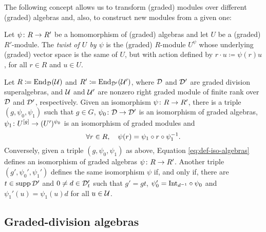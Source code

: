 The following concept allows us to transform (graded) modules over different (graded) algebras and, also, to construct new modules from a given one:

\begin{defi}\label{def:twist}
    Let $\psi\colon R \to R'$ be a homomorphism of (graded) algebras and let $U$ be a (graded) $R' $-module. 
    The \emph{twist of $U$ by $\psi$} is the (graded) $R$-module $U^{\psi}$ whose underlying (graded) vector space is the same of $U$, but with action defined by $r \cdot u \coloneqq \psi(r)u$, for all $r\in R$ and $u\in U$.
\end{defi}

\begin{thm}\label{thm:iso-abstract}
    Let $R \coloneqq \operatorname{End}_{\mathcal{D}}(\mathcal U)$ and $R' \coloneqq \operatorname{End}_{\mathcal{D}'}(\mathcal U')$, where $\mathcal{D}$ and $\mathcal{D}'$ are graded division superalgebras, and $\mathcal U$ and $\mathcal U'$ are nonzero right graded module of finite rank over $\mathcal{D}$ and $\mathcal{D}'$, respectively. 
    Given an isomorphism $\psi\colon R \to R'$, there is a triple $(g, \psi_0, \psi_1)$ such that $g \in G$, $\psi_0\colon \mathcal{D} \to \mathcal{D}'$ is an isomorphism of graded algebras, $\psi_1\colon U^{[g]} \to (U')^{\psi_0}$ is an isomorphism of graded modules and 
    \begin{equation}\label{eq:def-iso-algebras}
            \forall r\in R, \quad \psi(r) = \psi_1 \circ r \circ \psi_1^{-1}.
    \end{equation}
    Conversely, given a triple $(g, \psi_0, \psi_1)$ as above, Equation \eqref{eq:def-iso-algebras} defines an isomorphism of graded algebras $\psi\colon R \to R'$. 
    Another triple $(g', \psi_0', \psi_1')$ defines the same isomorphism $\psi$ if, and only if, there are $t\in \operatorname{supp} \mathcal{D}'$ and $0 \neq d\in \mathcal{D}'_t$ such that $g'= gt$, $\psi_0' = \mathrm{Int}_{d^{-1}} \circ \psi_0$ and $\psi_1' (u) = \psi_1 (u) d$ for all $u \in \mathcal U$.
\end{thm}

\subsection{Graded-division algebras}

